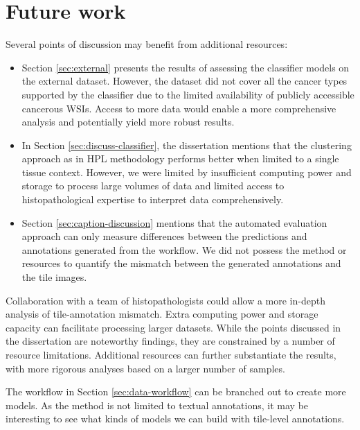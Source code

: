 \documentclass{l4proj}
\begin{document}
\section{Future work} \label{sec:future-work}
Several points of discussion may benefit from additional resources:
\begin{itemize}
    \item Section \ref{sec:external} presents the results of assessing the classifier models on the external dataset. However, the dataset did not cover all the cancer types supported by the classifier due to the limited availability of publicly accessible cancerous WSIs. Access to more data would enable a more comprehensive analysis and potentially yield more robust results.
    \item In Section \ref{sec:discuss-classifier}, the dissertation mentions that the clustering approach as in HPL methodology performs better when limited to a single tissue context. However, we were limited by insufficient computing power and storage to process large volumes of data and limited access to histopathological expertise to interpret data comprehensively.
    \item Section \ref{sec:caption-discussion} mentions that the automated evaluation approach can only measure differences between the predictions and annotations generated from the workflow. We did not possess the method or resources to quantify the mismatch between the generated annotations and the tile images.
\end{itemize} 
Collaboration with a team of histopathologists could allow a more in-depth analysis of tile-annotation mismatch. Extra computing power and storage capacity can facilitate processing larger datasets. While the points discussed in the dissertation are noteworthy findings, they are constrained by a number of resource limitations. Additional resources can further substantiate the results, with more rigorous analyses based on a larger number of samples.

The workflow in Section \ref{sec:data-workflow} can be branched out to create more models. As the method is not limited to textual annotations, it may be interesting to see what kinds of models we can build with tile-level annotations.
\end{document}
